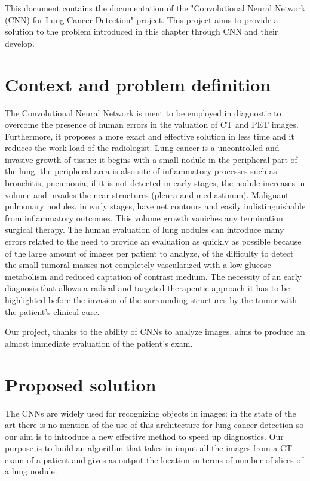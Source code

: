 \documentclass[../main.tex]{subfiles}
\begin{document}
\thispagestyle{empty}
This document contains the documentation of the "Convolutional Neural Network (CNN) for Lung Cancer Detection" project. This project aims to provide a solution to the problem introduced in this chapter through CNN and their develop.

\section{Context and problem definition}
The Convolutional Neural Network is ment to be employed in diagnostic to overcome the presence of human errors in the valuation of CT and PET images. Furthermore, it proposes a more exact and effective solution in less time and it reduces the work load of the radiologist.
Lung cancer is a uncontrolled and invasive growth of tissue: it begins with a small nodule in the peripheral part of the lung. the peripheral area is also site of inflammatory processes such as bronchitis, pneumonia; if it is not detected in early stages, the nodule increases in volume and invades the near structures (pleura and mediastinum). Malignant pulmonary nodules, in early stages, have net contours and easily indistinguishable from inflammatory outcomes. This volume growth vaniches any termination surgical therapy.
The human evaluation of lung nodules can introduce many errors related to the need to provide an evaluation as quickly as possible because of the large amount of images per patient to analyze, of the difficulty to detect the small tumoral masses not completely vascularized with a low glucose metabolism and reduced captation of contrast medium.
The necessity of an early diagnosis that allows a radical and targeted therapeutic approach it has to be highlighted before the invasion of the  surrounding structures by the tumor with the patient's clinical cure.
\vspace{5mm}

Our project, thanks to the ability of CNNs to analyze images, aims to produce an almost immediate evaluation of the patient's exam.

\section{Proposed solution}
The CNNs are widely used for recognizing objects in images: in the state of the art there is no mention of the use of this architecture for lung cancer detection so our aim is to introduce a new effective method to speed up diagnostics.
Our purpose is to build an algorithm that takes in imput all the images from a CT exam of a patient and gives as output the location in terms of number of slices of a lung nodule.
\end{document}
